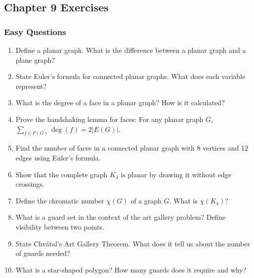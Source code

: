 \documentclass{article}
\theoremstyle{definition}
\begin{document}
\newpage

\subsection{Chapter 9 Exercises}

\subsubsection{Easy Questions}
\begin{enumerate}
\item Define a planar graph. What is the difference between a planar graph and a plane graph?

\item State Euler's formula for connected planar graphs. What does each variable represent?

\item What is the degree of a face in a planar graph? How is it calculated?

\item Prove the handshaking lemma for faces: For any planar graph $G$, $\sum_{f \in F(G)} \deg(f) = 2|E(G)|$.

\item Find the number of faces in a connected planar graph with 8 vertices and 12 edges using Euler's formula.

\item Show that the complete graph $K_4$ is planar by drawing it without edge crossings.

\item Define the chromatic number $\chi(G)$ of a graph $G$. What is $\chi(K_4)$?

\item What is a guard set in the context of the art gallery problem? Define visibility between two points.

\item State Chvátal's Art Gallery Theorem. What does it tell us about the number of guards needed?

\item What is a star-shaped polygon? How many guards does it require and why?
\end{enumerate}
\end{document}
